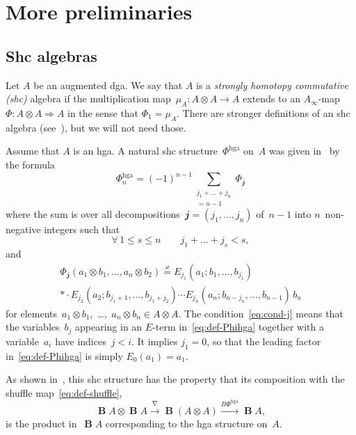 \documentclass[letterpaper]{amsart}
\numberwithin{equation}{section}
\theoremstyle{plain}
\theoremstyle{definition}
\theoremstyle{remark}
\let\newterm\emph
\def\Ainf{A_{\infty}}
\DeclareMathOperator{\BB}{\mathbf{B}}
\let\KS\varkappa
\def\eqKS{\stackrel{\KS}{=}}
\let\shuffle\nabla
\def\Phihga{\Phi^{\mathrm{hga}}}
\def\jj{\mathbfit{j}}
\begin{document}
\section{More preliminaries}
\label{sec:prelim-2}


\subsection{Shc algebras}

Let $A$ be an augmented dga. We say that $A$ is a \newterm{strongly homotopy commutative (shc)} algebra
if the multiplication map~$\mu_{A}\colon A\otimes A\to A$
extends to an $\Ainf$-map~$\Phi\colon A\otimes A\Rightarrow A$ in the sense that $\Phi_{1}=\mu_{A}$.
There are stronger definitions of an shc algebra (see~\cite[Sec.~1]{Franz:hgashc}), but we will not need those.

Assume that $A$ is an hga.
A natural shc structure~$\Phihga$ on~$A$ was given in~\cite[Prop.~4.1]{Franz:hgashc} by the formula
\begin{equation}
  \Phihga_{n} = (-1)^{n-1}\sum_{\substack{j_{1}+\dots+j_{n}\\=n-1}} \Phi_{\jj}
\end{equation}
where the sum is over all decompositions~$\jj=(j_{1},\dots,j_{n})$ of~$n-1$ into $n$~non-neg\-a\-tive integers %
such that
\begin{equation}
  \label{eq:cond-j}
  \forall\, 1\le s\le n \qquad j_{1}+\dots+j_{s} < s,
\end{equation}
and
\begin{multline}
  \label{eq:def-Phihga}
  \Phi_{\jj}(a_{1}\otimes b_{1},\dots,a_{n}\otimes b_{2}) \eqKS 
  E_{j_{1}}(a_{1};b_{1},\dots,b_{j_{1}}) \\* \cdot E_{j_{2}}(a_{2};b_{j_{1}+1},\dots,b_{j_{1}+j_{2}})
  \cdots E_{j_{n}}(a_{n};b_{n-j_{n}},\dots,b_{n-1})\,b_{n}
\end{multline}
for elements~$a_{1}\otimes b_{1}$,~\dots,~$a_{n}\otimes b_{n}\in A\otimes A$.
The condition~\eqref{eq:cond-j} means that the variables~$b_{j}$ appearing in an $E$-term in~\eqref{eq:def-Phihga}
together with a variable~$a_{i}$ have indices~$j<i$.
It implies $j_{1}=0$, so that the leading factor in~\eqref{eq:def-Phihga} is simply $E_{0}(a_{1})=a_{1}$.

As shown in~\cite[Prop.~4.3]{Franz:hgashc},
this shc structure has the property that its composition with the shuffle map~\eqref{eq:def-shuffle},
\begin{equation}
  \BB A\otimes \BB A \xrightarrow{\shuffle} \BB(A\otimes A) \xrightarrow{B\Phihga} \BB A,
\end{equation}
is the product in~$\BB A$ corresponding to the hga structure on~$A$.
\end{document}
